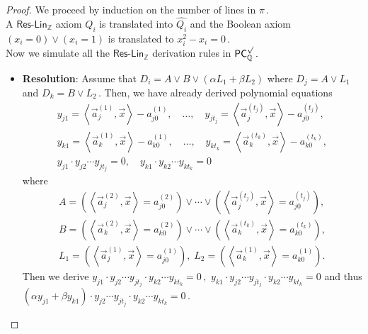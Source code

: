 \documentclass[11pt]{article}
\newcommand{\Q}{{\mathbb Q}}
\newcommand{\Z}{{\mathbb Z}}
\begin{document}
\begin{proof}
We proceed by induction on the number of lines in %
$\pi\,.$ %
\mbox{}\\  A $\mathsf{Res}$-$\mathsf{Lin}_\Z$ axiom $Q_i$ is translated into $\widehat{Q_i}$ and the Boolean axiom  $(x_i = 0) \vee (x_i = 1)$ is translated to %
$x_i^2 - x_i = 0\,.$ %
\mbox{}\\  Now we simulate all the $\mathsf{Res}$-$\mathsf{Lin}_\Z$ derivation rules in %
$\mathsf{PC}_{\Q}^{\surd}\,.$ %
\begin{itemize}
    \item \textbf{Resolution}: Assume that $D_i = A \vee B \vee (\alpha L_1 + \beta L_2)$ where $D_j = A \vee L_1$ and %
$D_k = B \vee L_2\,.$ %
 Then, we have already derived polynomial equations
    \begin{align*}
    y_{j 1} = \left\langle \vec a_j^{(1)}, \vec x \right \rangle - a_{j 0}^{(1)}, \quad \ldots, \quad y_{j t_j} = \left \langle \vec a_j^{(t_j)}, \vec x \right \rangle - a_{j 0}^{(t_j)},\\
    y_{k 1} = \left \langle \vec a_k^{(1)}, \vec x \right \rangle - a_{k 0}^{(1)}, \quad \ldots, \quad y_{k t_k} = \left \langle \vec a_k^{(t_k)}, \vec x \right \rangle - a_{k 0}^{(t_k)},\\ %
    y_{j 1} \cdot y_{j 2} \cdots y_{j t_j} = 0, \quad y_{k 1} \cdot y_{k 2} \cdots y_{k t_k} = 0
    \end{align*}
    where 
	\begin{align*}
    A = \left( \left\langle \vec a_j^{(2)}, \vec x \right \rangle = a_{j 0}^{(2)}\right) \vee \cdots \vee \left( \left\langle \vec a_j^{(t_j)}, \vec x \right \rangle = a_{j 0}^{(t_j)}\right), \\
    B = \left( \left\langle \vec a_k^{(2)}, \vec x \right \rangle = a_{k 0}^{(2)}\right) \vee \cdots \vee \left( \left\langle \vec a_k^{(t_k)}, \vec x \right \rangle = a_{k 0}^{(t_k)}\right), \\
    L_1 = \left( \left\langle \vec a_j^{(1)}, \vec x \right \rangle = a_{j 0}^{(1)}\right), \; L_2 = \left( \left\langle \vec a_k^{(1)}, \vec x \right \rangle = a_{k 0}^{(1)}\right).
    \end{align*}
    Then we derive %
$y_{j 1} \cdot y_{j 2} \cdots y_{j t_j} \cdot y_{k 2} \cdots y_{k t_k} = 0\,,$ %
 $y_{k 1} \cdot y_{j 2} \cdots y_{j t_j} \cdot y_{k 2} \cdots y_{k t_k} = 0$ and thus %
$(\alpha y_{j 1} + \beta y_{k 1}) \cdot y_{j 2} \cdots y_{j t_j} \cdot y_{k 2} \cdots y_{k t_k} = 0\,.$ %

\end{itemize}
\end{proof}
\end{document}
